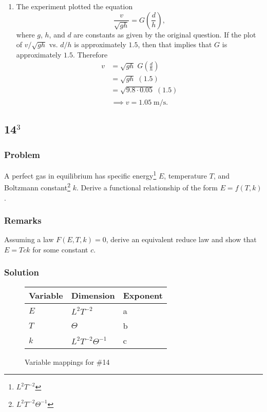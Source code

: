 \documentclass[12pt]{article}
\begin{document}
\begin{enumerate}
  \item The experiment plotted the equation
    \begin{equation*}
      \frac{v}{\sqrt{gh}} = G\left(\frac{d}{h}\right),
    \end{equation*}
    where $g$, $h$, and $d$ are constants as given by the original question. If
    the plot of $v/\sqrt{gh}$ vs. $d/h$ is approximately $1.5$, then that
    implies that $G$ is approximately $1.5$. Therefore
    \begin{equation*}
      \begin{aligned}
        v &= \sqrt{gh}\;G\left(\frac{d}{h}\right) \\
        &= \sqrt{gh}\;(1.5) \\
        &= \sqrt{9.8\cdot0.05}\;(1.5) \\
        \end{aligned}
    \end{equation*}
    \begin{equation*}
      \boxed{\implies v = 1.05\;\text{m/s}.}
    \end{equation*}
  \end{enumerate}

\subsection{14$^3$}
  \subsubsection*{Problem}
  A perfect gas in equilibrium has specific energy\footnote{$L^2T^{-2}$} $E$,
  temperature $T$, and Boltzmann constant\footnote{$L^2T^{-2}\Theta^{-1}$} $k$.
  Derive a functional relationship of the form $E=f(T,k)$.

  \subsubsection*{Remarks}
  Assuming a law $F(E,T,k)=0$, derive an equivalent reduce law and show that
  $E=Tck$ for some constant $c$.

  \subsubsection*{Solution}

  \begin{figure}
    \centering
    \begin{tabularx}{0.5\textwidth}{XXX}
      Variable & Dimension & Exponent \\ \midrule
      $E$ & $L^2T^{-2}$ & a \\
      $T$ & $\Theta$ & b \\
      $k$ & $L^2T^{-2}\Theta^{-1}$ & c \\
    \end{tabularx}
    \caption{Variable mappings for \#14}
\label{fig:14-var-mappings}
  \end{figure}
\end{document}
